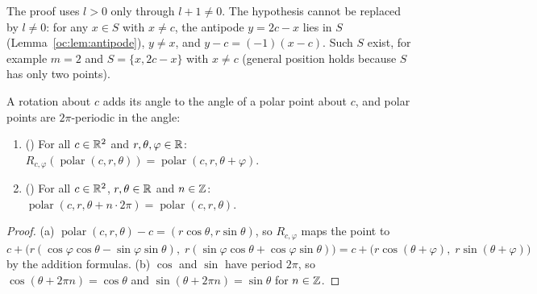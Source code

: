 \begin{remark}\label{oc:rem:ray}
The proof uses $l>0$ only through $l+1\ne0$. The hypothesis cannot be replaced by $l\ne0$: for any
$x\in S$ with $x\ne c$, the antipode $y=2c-x$ lies in $S$ (Lemma~\ref{oc:lem:antipode}), $y\ne x$, and
$y-c=(-1)(x-c)$. Such $S$ exist, for example $m=2$ and $S=\{x,2c-x\}$ with $x\ne c$ (general position
holds because $S$ has only two points).
\end{remark}

\begin{lemma}\label{oc:lem:polar-rot}
A rotation about $c$ adds its angle to the angle of a polar point about $c$, and polar points are
$2\pi$-periodic in the angle:
\begin{enumerate}[label=(\alph*)]
\item () For all $c\in\mathbb R^2$ and $r,\theta,\varphi\in\mathbb R$:
  $R_{c,\varphi}(\operatorname{polar}(c,r,\theta))=\operatorname{polar}(c,r,\theta+\varphi)$.
\item () For all $c\in\mathbb R^2$, $r,\theta\in\mathbb R$ and $n\in\mathbb Z$:
  $\operatorname{polar}(c,r,\theta+n\cdot2\pi)=\operatorname{polar}(c,r,\theta)$.
\end{enumerate}
\end{lemma}
\begin{proof}
(a) $\operatorname{polar}(c,r,\theta)-c=(r\cos\theta,r\sin\theta)$, so $R_{c,\varphi}$ maps the point to
$c+\bigl(r(\cos\varphi\cos\theta-\sin\varphi\sin\theta),\;r(\sin\varphi\cos\theta+\cos\varphi\sin\theta)\bigr)
=c+\bigl(r\cos(\theta+\varphi),\;r\sin(\theta+\varphi)\bigr)$ by the addition formulas.
(b) $\cos$ and $\sin$ have period $2\pi$, so $\cos(\theta+2\pi n)=\cos\theta$ and
$\sin(\theta+2\pi n)=\sin\theta$ for $n\in\mathbb Z$.
\end{proof}

